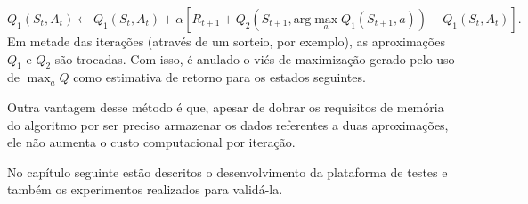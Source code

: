 \begin{equation}
\label{eq:doubleq}
Q_1(S_t, A_t) \leftarrow Q_1(S_t, A_t) + \alpha[R_{t+1} + Q_2(S_{t+1}, \text{arg}\max_a Q_1(S_{t+1}, a)) - Q_1(S_t, A_t)].
\end{equation}
% 
Em metade das iterações (através de um sorteio, por exemplo), as aproximações $Q_1$ e $Q_2$ são trocadas. Com isso, é anulado o viés de maximização gerado pelo uso de $\max_a Q$ como estimativa de retorno para os estados seguintes.

Outra vantagem desse método é que, apesar de dobrar os requisitos de memória do algoritmo por ser preciso armazenar os dados referentes a duas aproximações, ele não aumenta o custo computacional por iteração.

No capítulo seguinte estão descritos o desenvolvimento da plataforma de testes e também os experimentos realizados para validá-la.